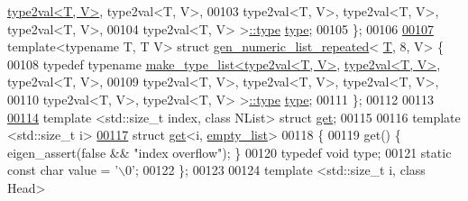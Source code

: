 \begin{DoxyCode}
      \hyperlink{struct_eigen_1_1internal_1_1type2val}{type2val<T, V>}, type2val<T, V>,
00103                                   type2val<T, V>, type2val<T, V>, type2val<T, V>,
00104                                   type2val<T, V> >\hyperlink{struct_eigen_1_1internal_1_1type__list}{::type} \hyperlink{struct_eigen_1_1internal_1_1type__list}{type};
00105 \};
00106 
\hyperlink{struct_eigen_1_1internal_1_1gen__numeric__list__repeated_3_01_t_00_018_00_01_v_01_4}{00107} \textcolor{keyword}{template}<\textcolor{keyword}{typename} T, T V> \textcolor{keyword}{struct }\hyperlink{struct_eigen_1_1internal_1_1gen__numeric__list__repeated}{gen\_numeric\_list\_repeated}<
      \hyperlink{group___sparse_core___module}{T}, 8, V> \{
00108   \textcolor{keyword}{typedef} \textcolor{keyword}{typename} \hyperlink{struct_eigen_1_1internal_1_1make__type__list}{make\_type\_list<type2val<T, V>}, 
      \hyperlink{struct_eigen_1_1internal_1_1type2val}{type2val<T, V>}, type2val<T, V>,
00109                                   type2val<T, V>, type2val<T, V>, type2val<T, V>,
00110                                   type2val<T, V>, type2val<T, V> >\hyperlink{struct_eigen_1_1internal_1_1type__list}{::type} 
      \hyperlink{struct_eigen_1_1internal_1_1type__list}{type};
00111 \};
00112 
00113 
\hyperlink{struct_eigen_1_1internal_1_1get}{00114} \textcolor{keyword}{template} <std::\textcolor{keywordtype}{size\_t} index, \textcolor{keyword}{class} NList> \textcolor{keyword}{struct }\hyperlink{struct_eigen_1_1internal_1_1get}{get};
00115 
00116 \textcolor{keyword}{template} <std::\textcolor{keywordtype}{size\_t} i>
\hyperlink{struct_eigen_1_1internal_1_1get_3_01i_00_01empty__list_01_4}{00117} \textcolor{keyword}{struct }\hyperlink{struct_eigen_1_1internal_1_1get}{get}<i, \hyperlink{struct_eigen_1_1internal_1_1empty__list}{empty\_list}>
00118 \{
00119   \textcolor{keyword}{get}() \{ eigen\_assert(\textcolor{keyword}{false} && \textcolor{stringliteral}{"index overflow"}); \}
00120   \textcolor{keyword}{typedef} \textcolor{keywordtype}{void} type;
00121   \textcolor{keyword}{static} \textcolor{keyword}{const} \textcolor{keywordtype}{char} value = \textcolor{charliteral}{'\(\backslash\)0'};
00122 \};
00123 
00124 \textcolor{keyword}{template} <std::\textcolor{keywordtype}{size\_t} i, \textcolor{keyword}{class} Head>

\end{DoxyCode}
